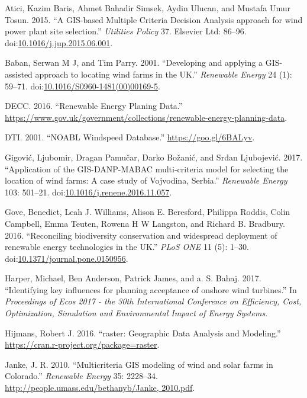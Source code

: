 \documentclass[a4paper,]{article}
\theoremstyle{definition}
\theoremstyle{definition}
\theoremstyle{remark}
\begin{document}
{\hypertarget{refs}{}
\hypertarget{ref-Atici2015}{}
Atici, Kazim Baris, Ahmet Bahadir Simsek, Aydin Ulucan, and Mustafa Umur
Tosun. 2015. ``A GIS-based Multiple Criteria Decision Analysis approach
for wind power plant site selection.'' \emph{Utilities Policy} 37.
Elsevier Ltd: 86--96.
doi:\href{https://doi.org/10.1016/j.jup.2015.06.001}{10.1016/j.jup.2015.06.001}.

\hypertarget{ref-Baban2001}{}
Baban, Serwan M J, and Tim Parry. 2001. ``Developing and applying a
GIS-assisted approach to locating wind farms in the UK.''
\emph{Renewable Energy} 24 (1): 59--71.
doi:\href{https://doi.org/10.1016/S0960-1481(00)00169-5}{10.1016/S0960-1481(00)00169-5}.

\hypertarget{ref-DECC2016}{}
DECC. 2016. ``Renewable Energy Planing Data.''
\url{https://www.gov.uk/government/collections/renewable-energy-planning-data}.

\hypertarget{ref-DTI2001}{}
DTI. 2001. ``NOABL Windspeed Database.'' \url{https://goo.gl/6BALyv}.

\hypertarget{ref-Gigovic2017}{}
Gigović, Ljubomir, Dragan Pamučar, Darko Božanić, and Srđan Ljubojević.
2017. ``Application of the GIS-DANP-MABAC multi-criteria model for
selecting the location of wind farms: A case study of Vojvodina,
Serbia.'' \emph{Renewable Energy} 103: 501--21.
doi:\href{https://doi.org/10.1016/j.renene.2016.11.057}{10.1016/j.renene.2016.11.057}.

\hypertarget{ref-Gove2016a}{}
Gove, Benedict, Leah J. Williams, Alison E. Beresford, Philippa Roddis,
Colin Campbell, Emma Teuten, Rowena H W Langston, and Richard B.
Bradbury. 2016. ``Reconciling biodiversity conservation and widespread
deployment of renewable energy technologies in the UK.'' \emph{PLoS ONE}
11 (5): 1--30.
doi:\href{https://doi.org/10.1371/journal.pone.0150956}{10.1371/journal.pone.0150956}.

\hypertarget{ref-Harper2017}{}
Harper, Michael, Ben Anderson, Patrick James, and a. S. Bahaj. 2017.
``Identifying key influences for planning acceptance of onshore wind
turbines.'' In \emph{Proceedings of Ecos 2017 - the 30th International
Conference on Efficiency, Cost, Optimization, Simulation and
Environmental Impact of Energy Systems}.

\hypertarget{ref-raster}{}
Hijmans, Robert J. 2016. ``raster: Geographic Data Analysis and
Modeling.'' \url{https://cran.r-project.org/package=raster}.

\hypertarget{ref-Janke2010}{}
Janke, J. R. 2010. ``Multicriteria GIS modeling of wind and solar farms
in Colorado.'' \emph{Renewable Energy} 35: 2228--34.
\href{http://people.umass.edu/bethanyb/Janke,\%202010.pdf}{http://people.umass.edu/bethanyb/Janke, 2010.pdf}.

}
\end{document}
